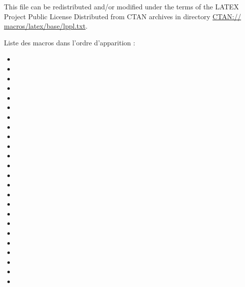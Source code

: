 \documentclass[DIV         = 14,
               fontsize    = 10,
               headinclude = false,
               footinclude = false,
               index       = totoc,
               twoside,
               headings    = small]{tkz-doc}
\begin{document}
This file can be redistributed and/or modified under the terms of the LATEX 
Project Public License Distributed from CTAN archives in directory \url{CTAN:// 
macros/latex/base/lppl.txt}.    



 \clearpage
 \tableofcontents
 \clearpage


Liste des macros dans l'ordre d'apparition :

\medskip
\begin{itemize}
\item {}
\item {}
\item {}
\item {}
\item {}
\item {}
\item {}
\item {}
\item {}
\item {}
\item {}
\item {}
\item {}
\item {}
\item {}
\item {}
\item {}
\item {}
\item {}
\item {}
\item {}
\item {}
\item {}
\item {}
\end{itemize}

\vfill
\renewcommand*{\VertexLightFillColor}{fondpaille} 
%











\clearpage\newpage
\small\printindex
\end{document}
